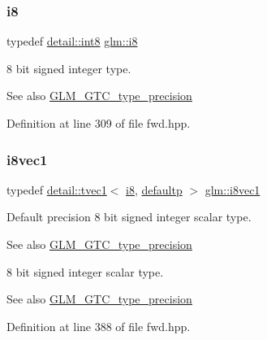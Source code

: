 \subsubsection{\texorpdfstring{i8}{i8}}
{\footnotesize\ttfamily typedef \hyperlink{namespaceglm_1_1detail_a04b526a8d7a9b455602a0afa78c531e0}{detail\+::int8} \hyperlink{group__gtc__type__precision_gaae064be68b7d36cd7910c16e8ad18bba}{glm\+::i8}}

8 bit signed integer type. \begin{DoxySeeAlso}{See also}
\hyperlink{group__gtc__type__precision}{G\+L\+M\+\_\+\+G\+T\+C\+\_\+type\+\_\+precision} 
\end{DoxySeeAlso}


Definition at line 309 of file fwd.\+hpp.

\mbox{\label{group__gtc__type__precision_gae67d2e1e7ebd1a79176cac554395b881}} 
\subsubsection{\texorpdfstring{i8vec1}{i8vec1}}
{\footnotesize\ttfamily typedef \hyperlink{structglm_1_1detail_1_1tvec1}{detail\+::tvec1}$<$ \hyperlink{group__gtc__type__precision_gaae064be68b7d36cd7910c16e8ad18bba}{i8}, \hyperlink{namespaceglm_a0f04f086094c747d227af4425893f545a9d21ccd8b5a009ec7eb7677befc3bf51}{defaultp} $>$ \hyperlink{group__gtc__type__precision_gae67d2e1e7ebd1a79176cac554395b881}{glm\+::i8vec1}}

Default precision 8 bit signed integer scalar type. \begin{DoxySeeAlso}{See also}
\hyperlink{group__gtc__type__precision}{G\+L\+M\+\_\+\+G\+T\+C\+\_\+type\+\_\+precision}
\end{DoxySeeAlso}
8 bit signed integer scalar type. \begin{DoxySeeAlso}{See also}
\hyperlink{group__gtc__type__precision}{G\+L\+M\+\_\+\+G\+T\+C\+\_\+type\+\_\+precision} 
\end{DoxySeeAlso}


Definition at line 388 of file fwd.\+hpp.

\mbox{\label{group__gtc__type__precision_gafd7bbd3878c298014276975f999a8677}} 
